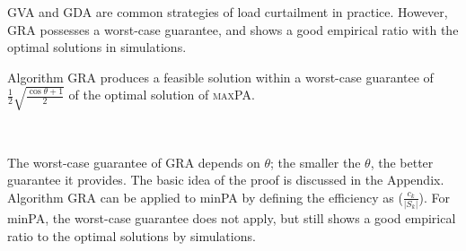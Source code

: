 {\sc GVA} and {\sc GDA} are common strategies of load curtailment in practice. 
However, {\sc GRA} possesses a worst-case guarantee, and shows a good empirical ratio with the optimal solutions in simulations.
\\

\begin{customthm}{1} \label{thm:alg-greedy}
Algorithm {\sc GRA} produces a feasible solution within a worst-case guarantee of $\frac{1}{2} \sqrt{\frac{\cos \theta + 1}{2}}$ of the optimal solution of \textsc{maxPA}.
\end{customthm}
\

The worst-case guarantee of {\sc GRA} depends on $\theta$; the smaller the $\theta$, the better guarantee it provides. The basic idea of the proof is discussed in the Appendix. Algorithm {\sc GRA} can be applied to {\sc minPA} by defining the efficiency as ($\frac{c_k}{|S_k|}$). For {\sc minPA}, the worst-case guarantee does not apply, but still shows a good empirical ratio to the optimal solutions by simulations.
